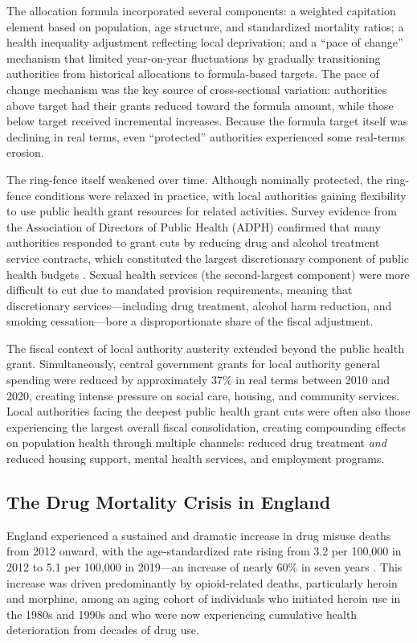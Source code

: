 \documentclass[12pt]{article}
\begin{document}
The allocation formula incorporated several components: a weighted capitation element based on population, age structure, and standardized mortality ratios; a health inequality adjustment reflecting local deprivation; and a ``pace of change'' mechanism that limited year-on-year fluctuations by gradually transitioning authorities from historical allocations to formula-based targets. The pace of change mechanism was the key source of cross-sectional variation: authorities above target had their grants reduced toward the formula amount, while those below target received incremental increases. Because the formula target itself was declining in real terms, even ``protected'' authorities experienced some real-terms erosion.

The ring-fence itself weakened over time. Although nominally protected, the ring-fence conditions were relaxed in practice, with local authorities gaining flexibility to use public health grant resources for related activities. Survey evidence from the Association of Directors of Public Health (ADPH) confirmed that many authorities responded to grant cuts by reducing drug and alcohol treatment service contracts, which constituted the largest discretionary component of public health budgets \citep{adph2019}. Sexual health services (the second-largest component) were more difficult to cut due to mandated provision requirements, meaning that discretionary services---including drug treatment, alcohol harm reduction, and smoking cessation---bore a disproportionate share of the fiscal adjustment.

The fiscal context of local authority austerity extended beyond the public health grant. Simultaneously, central government grants for local authority general spending were reduced by approximately 37\% in real terms between 2010 and 2020, creating intense pressure on social care, housing, and community services. Local authorities facing the deepest public health grant cuts were often also those experiencing the largest overall fiscal consolidation, creating compounding effects on population health through multiple channels: reduced drug treatment \textit{and} reduced housing support, mental health services, and employment programs.

\subsection{The Drug Mortality Crisis in England}

England experienced a sustained and dramatic increase in drug misuse deaths from 2012 onward, with the age-standardized rate rising from 3.2 per 100,000 in 2012 to 5.1 per 100,000 in 2019---an increase of nearly 60\% in seven years \citep{ons2024drugsdeaths}. This increase was driven predominantly by opioid-related deaths, particularly heroin and morphine, among an aging cohort of individuals who initiated heroin use in the 1980s and 1990s and who were now experiencing cumulative health deterioration from decades of drug use.
\end{document}
